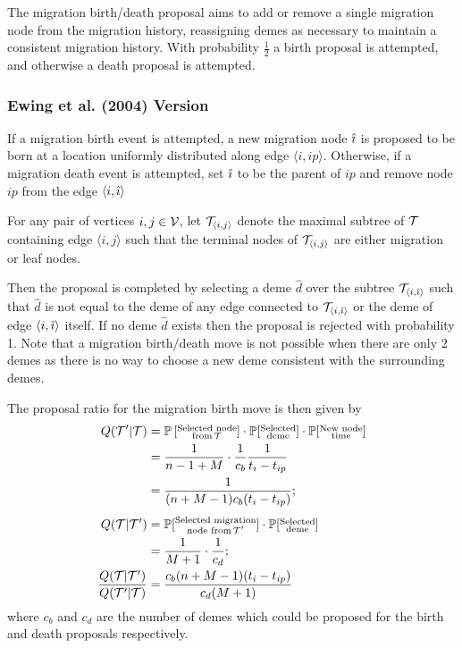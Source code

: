 The migration birth/death proposal aims to add or remove a single migration node from the migration history, reassigning demes as necessary to maintain a consistent migration history. With probability $\frac{1}{2}$ a birth proposal is attempted, and otherwise a death proposal is attempted.

\subsubsection{Ewing et al. (2004) Version}
If a migration birth event is attempted, a new migration node $\hat{\imath}$ is proposed to be born at a location uniformly distributed along edge $\langle i, ip \rangle$. Otherwise, if a migration death event is attempted, set $\hat{\imath}$ to be the parent of $ip$ and remove node $ip$ from the edge $\langle i, \hat{\imath} \rangle$

For any pair of vertices $i,j \in \mathcal{V}$, let $\mathcal{T}_{\langle i, j \rangle}$ denote the maximal subtree of $\mathcal{T}$ containing edge $\langle i, j \rangle$ such that the terminal nodes of $\mathcal{T}_{\langle i, j \rangle}$ are either migration or leaf nodes.

Then the proposal is completed by selecting a deme $\hat{d}$ over the subtree $\mathcal{T}_{\langle i, \hat{\imath} \rangle}$ such that $\hat{d}$ is not equal to the deme of any edge connected to $\mathcal{T}_{\langle i, \hat{\imath} \rangle}$ or the deme of edge $\langle i, \hat{\imath} \rangle$ itself. If no deme $\hat{d}$ exists then the proposal is rejected with probability 1. Note that a migration birth/death move is not possible when there are only 2 demes as there is no way to choose a new deme consistent with the surrounding demes.

The proposal ratio for the migration birth move is then given by
\begin{align*}
	Q( \mathcal{T}' | \mathcal{T}) & = \mathbb{P} \left[ \substack{\text{Selected node} \\ \text{from} \, \mathcal{T}} \right] \cdot \mathbb{P}[\substack{\text{Selected}\\ \text{deme}}] \cdot \mathbb{P}[\substack{\text{New node} \\ \text{time}}] \\
	& = \frac{1}{n-1+M} \cdot \frac{1}{c_b} \frac{1}{t_i - t_{ip}} \\
	& = \frac{1}{(n+M-1)c_b (t_i - t_{ip})}; \\[1ex]
	Q(\mathcal{T} | \mathcal{T}') & = \mathbb{P}[\substack{\text{Selected migration} \\ \text{node from} \, \mathcal{T}'}] \cdot \mathbb{P}[\substack{\text{Selected} \\ \text{deme}}] \\
	& = \frac{1}{M+1} \cdot \frac{1}{c_d}; \\
	\frac{Q(\mathcal{T} | \mathcal{T}')}{Q(\mathcal{T}' | \mathcal{T})} & = \frac{c_b (n+M-1) (t_i - t_{ip})}{c_d(M+1)}
\end{align*}
where $c_b$ and $c_d$ are the number of demes which could be proposed for the birth and death proposals respectively.

